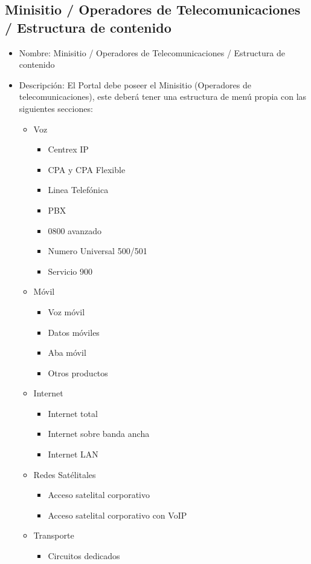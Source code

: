 \documentclass[11pt, letterpaper, oneside, spanish]{scrbook}
\begin{document}
\subsection{Minisitio / Operadores de Telecomunicaciones / Estructura de contenido}
\label{sec-2-1-36}

\begin{itemize}
\item Nombre: Minisitio / Operadores de Telecomunicaciones / Estructura de contenido
\item Descripción: El Portal debe poseer el Minisitio (Operadores de
  telecomunicaciones), este deberá tener una estructura de menú propia con las
  siguientes secciones:
\begin{itemize}
\item Voz
\begin{itemize}
\item Centrex IP
\item CPA y CPA Flexible
\item Linea  Telefónica
\item PBX
\item 0800 avanzado
\item Numero Universal 500/501
\item Servicio 900
\end{itemize}
\item Móvil
\begin{itemize}
\item Voz  móvil
\item Datos móviles
\item Aba móvil
\item Otros productos
\end{itemize}
\item Internet
\begin{itemize}
\item Internet total
\item Internet sobre banda ancha
\item Internet LAN
\end{itemize}
\item Redes  Satélitales
\begin{itemize}
\item Acceso satelital corporativo
\item Acceso satelital corporativo con VoIP
\end{itemize}
\item Transporte
\begin{itemize}
\item Circuitos dedicados

\end{itemize}
\end{itemize}
\end{itemize}
\end{document}

